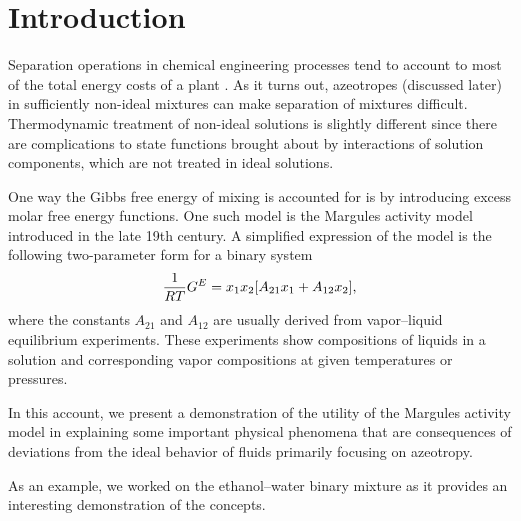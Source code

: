 \section{Introduction}



Separation operations in chemical engineering processes tend
to account to most of the total energy costs of a plant \cite{seppaper}. As
it turns out, azeotropes (discussed later) in sufficiently non-ideal
mixtures can make separation of mixtures difficult.
Thermodynamic treatment of non-ideal solutions is slightly different since
there are complications to state functions brought about by interactions of
solution components, which are not treated in ideal solutions.

One way the Gibbs free energy of mixing is accounted for is by introducing
excess molar free energy functions. One such model is the Margules activity model
introduced in the late 19th century. A simplified expression of the model
is the following two-parameter form for a binary system \cite[pp.~430]{enggbook}
\begin{equation}\label{eq:margules-two-param}
    \dfrac1{RT} G^E = x_1x_2 \qty[A_{21}x_1 + A_{12}x_2],
\end{equation}
where the constants $A_{21}$ and $A_{12}$ are usually derived from vapor--liquid
equilibrium experiments. These experiments show compositions of liquids in a
solution and corresponding vapor compositions at given temperatures or pressures.

In this account, we present a demonstration of the utility of the Margules
activity model in explaining some important physical phenomena that are
consequences of deviations from the ideal behavior of fluids primarily
focusing on azeotropy.

As an example, we worked on the ethanol--water binary mixture as it provides
an interesting demonstration of the concepts.

